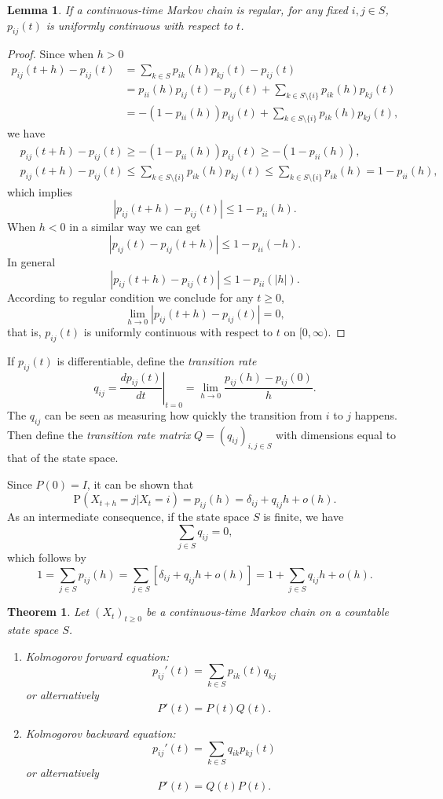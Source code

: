\documentclass{report}
\newtheorem{theorem}{Theorem}[section]
\newtheorem{lemma}{Lemma}[section]
\theoremstyle{nonumberplain}
\newtheorem{proof}{Proof.}
\begin{document}
\begin{lemma}
	If a continuous-time Markov chain is regular, for any fixed $i,j\in S$, $p_{ij}(t)$ is uniformly continuous with respect to $t$. 
\end{lemma}
\begin{proof}
	Since when $h>0$
	\[
	\begin{aligned}
		p_{ij}(t+h)-p_{ij}(t)&=\sum_{k\in S}p_{ik}(h)p_{kj}(t)-p_{ij}(t)\\
		&= p_{ii}(h)p_{ij}(t)-p_{ij}(t)+\sum_{k\in S\setminus\{i\}}p_{ik}(h)p_{kj}(t)\\
		&= -(1-p_{ii}(h))p_{ij}(t)+\sum_{k\in S\setminus\{i\}}p_{ik}(h)p_{kj}(t),
	\end{aligned}
	\]
	we have
	\[
	\begin{aligned}
	&p_{ij}(t+h)-p_{ij}(t)\ge -(1-p_{ii}(h))p_{ij}(t)\ge-(1-p_{ii}(h)),\\
	&p_{ij}(t+h)-p_{ij}(t)\le\sum_{k\in S\setminus\{i\}} p_{ik}(h)p_{kj}(t)\le \sum_{k\in S\setminus\{i\}}p_{ik}(h)=1-p_{ii}(h),	
	\end{aligned}
	\]
	which implies
	\[
	|p_{ij}(t+h)-p_{ij}(t)|\le 1-p_{ii}(h).
	\]
	When $h<0$ in a similar way we can get
	\[
	|p_{ij}(t)-p_{ij}(t+h)|\le 1-p_{ii}(-h).
	\]
	In general
	\[
	|p_{ij}(t+h)-p_{ij}(t)|\le 1-p_{ii}(|h|).
	\]
	According to regular condition we conclude for any $t\ge0$,
	\[
	\lim_{h\to0}|p_{ij}(t+h)-p_{ij}(t)|=0,
	\]
	that is, $p_{ij}(t)$ is uniformly continuous with respect to $t$ on $[0,\infty)$.
\end{proof}
If $p_{ij}(t)$ is differentiable, define the \emph{transition rate} 
\[
q_{ij}=\left.\frac{dp_{ij}(t)}{dt}\right|_{t=0}=\lim\limits_{h\to 0}\frac{p_{ij}(h)-p_{ij}(0)}{h}.
\]
The $q_{ij}$ can be seen as measuring how quickly the transition from $i$ to $j$ happens. Then define the \emph{transition rate matrix} $Q=(q_{ij})_{i,j\in S}$ with dimensions equal to that of the state space. 

\noindent Since $P(0)=I$, it can be shown that
\[
\mathrm{P}(X_{t+h}=j| X_t=i)=p_{ij}(h)=\delta _{ij}+q_{ij}h+o(h). 
\]
As an intermediate consequence, if the state space $S$ is finite, we have   
\[
\sum_{j\in S}q_{ij}=0,
\]
which follows by
\[
1=\sum_{j\in S}p_{ij}(h)=\sum_{j\in S}[\delta _{ij}+q_{ij}h+o(h)]=1+\sum_{j\in S}q_{ij}h+o(h).
\]
\begin{theorem}
	Let $(X_t)_{t\ge0}$ be a continuous-time Markov chain on a countable state space $S$.
	\begin{enumerate}
		\item Kolmogorov forward equation:
		\[
		p_{ij}'(t)=\sum_{k\in S}p_{ik}(t)q_{kj}
		\]
		or alternatively
		\[
		P'(t)=P(t)Q(t).
		\]
		\item Kolmogorov backward equation:
		\[
		p_{ij}'(t)=\sum_{k\in S}q_{ik}p_{kj}(t)
		\]
		or alternatively
		\[
		P'(t)=Q(t)P(t).
		\]
	\end{enumerate}
\end{theorem}
\end{document}
